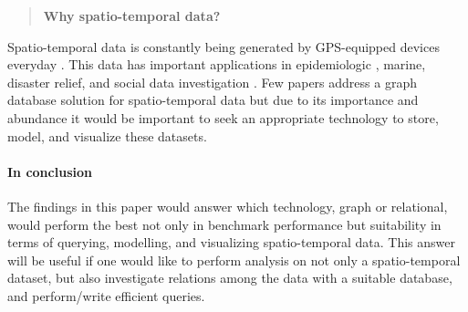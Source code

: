 \begin{quote}
    \textbf{Why spatio-temporal data?}
\end{quote}

Spatio-temporal data is constantly being generated by GPS-equipped devices everyday \cite{twitterdata}\cite{clost}. This data has important applications in epidemiologic \cite{spatiotemporal-epidemiology}, marine, disaster relief, and social data investigation \cite{rao2012spatiotemporal}. Few papers address a graph database solution for spatio-temporal data but due to its importance and abundance it would be important to seek an appropriate technology to store, model, and visualize these datasets.

\paragraph{In conclusion} The findings in this paper would answer which technology, graph or relational, would perform the best not only in benchmark performance but suitability in terms of querying, modelling, and visualizing spatio-temporal data. This answer will be useful if one would like to perform analysis on not only a spatio-temporal dataset, but also investigate relations among the data with a suitable database, and perform/write efficient queries.